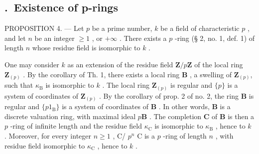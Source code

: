 \subsection*{\theappendixitem.\ Existence of p-rings}
{}

PROPOSITION 4. --- Let \(p\) be a prime number, \(k\) be a field of characteristic \(p\) , and let \(n\) be an integer \(\geqslant 1\) , or \(+\infty\) . There exists a \(p\) -ring (§ 2, no. 1, def. 1) of length \(n\) whose residue field is isomorphic to \(k\) .

One may consider \(k\) as an extension of the residue field \(\mathbf{Z}/p\mathbf{Z}\) of the local ring \(\mathbf{Z}_{(p)}\) . By the corollary of Th. 1, there exists a local ring \(\mathbf{B}\) , a swelling of \(\mathbf{Z}_{(p)}\), such that \(\kappa_{\mathrm{B}}\) is isomorphic to \(k\) . The local ring \(\mathbf{Z}_{(p)}\) is regular and \(\{p\}\) is a system of coordinates of \(\mathbf{Z}_{(p)}\) . By the corollary of prop. 2 of no. 2, the ring \(\mathbf{B}\) is regular and \(\{p1_{\mathrm{B}}\}\) is a system of coordinates of \(\mathbf{B}\) . In other words, \(\mathbf{B}\) is a discrete valuation ring, with maximal ideal \(p\mathbf{B}\) . The completion \(\mathbf{C}\) of \(\mathbf{B}\) is then a \(p\) -ring of infinite length and the residue field \(\kappa_{\mathrm{C}}\) is isomorphic to \(\kappa_{\mathrm{B}}\) , hence to \(k\) . Moreover, for every integer \(n \geqslant 1\) , C/ \(p^{n}\) C is a \(p\) -ring of length \(n\) , with residue field isomorphic to \(\kappa_{\mathrm{C}}\) , hence to \(k\) .

